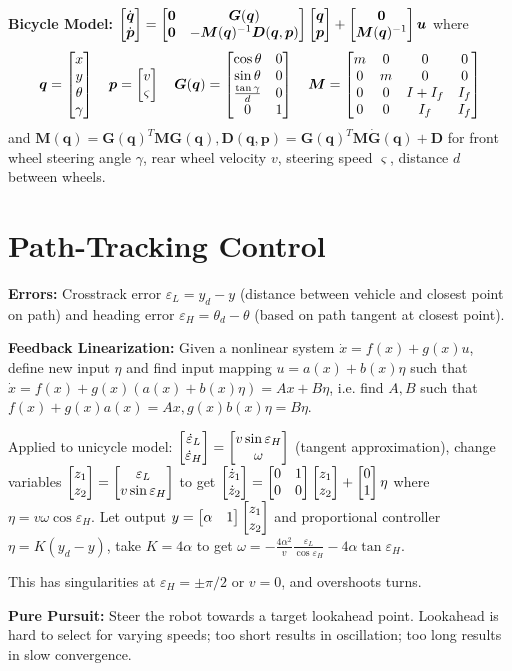 \documentclass[twocolumn, 8pt]{extarticle}
\begin{document}
\textbf{Bicycle Model:} \(\cvec{\dot{\bm q}}{\dot{\bm p}} = \mattwo{\bm 0}{\bm G(\bm q)}{\bm 0}{-\bm M(\bm q)^{-1}\bm D(\bm q, \bm p)}\cvec{\bm q}{\bm p} + \cvec{\bm 0}{\bm M(\bm q)^{-1}}\bm u\)
where
\[\bm q = \cvec{x}{y}{\theta}{\gamma} \quad \bm p = \cvec{v}{\varsigma} \quad \bm G(\bm q) = \mat{\mrow{\cos\theta}{0}\mrow{\sin\theta}{0}\mrow{\frac{\tan\gamma}{d}}{0}\mrow{0}{1}} \quad
\bm M = \matfour{m}{0}{0}{0}{0}{m}{0}{0}{0}{0}{I + I_f}{I_f}{0}{0}{I_f}{I_f}\]
and \(\bm M(\bm q) = \bm G(\bm q)^T\bm M\bm G(\bm q), \bm D(\bm q, \bm p) = \bm G(\bm q)^T\bm M\dot{\bm G}(\bm q) + \bm D\)
for front wheel steering angle \(\gamma\), rear wheel velocity \(v\), steering speed \(\varsigma\), distance \(d\)
between wheels.

\section{Path-Tracking Control} %

\textbf{Errors:} Crosstrack error \(\varepsilon _L = y_d - y\) (distance between vehicle and closest point on path) and
heading error \(\varepsilon _H = \theta _d - \theta\) (based on path tangent at closest point).

\textbf{Feedback Linearization:} Given a nonlinear system \(\dot x = f(x) + g(x)u\), define new input \(\eta\) and find
input mapping \(u = a(x) + b(x)\eta\) such that \(\dot x = f(x) + g(x)(a(x) + b(x)\eta) = Ax + B\eta\), i.e. find \(A, B\)
such that \(f(x) + g(x)a(x) = Ax, g(x)b(x)\eta = B\eta\).

Applied to unicycle model: \(\cvec{\dot\varepsilon _L}{\dot\varepsilon _H} = \cvec{v\sin\varepsilon _H}{\omega}\)
(tangent approximation), change variables \(\cvec{z_1}{z_2} = \cvec{\varepsilon _L}{v\sin\varepsilon _H}\) to get
\(\cvec{\dot z_1}{\dot z_2} = \mattwo{0}{1}{0}{0}\cvec{z_1}{z_2} + \cvec{0}{1}\eta\) where \(\eta = v\omega\cos\varepsilon _H\).
Let output \(y = \rvec{\alpha}{1}\cvec{z_1}{z_2}\) and proportional controller \(\eta = K(y_d - y)\), take \(K = 4\alpha\)
to get \(\displaystyle \omega = -\frac{4\alpha^2}{v}\frac{\varepsilon _L}{\cos\varepsilon _H} - 4\alpha\tan\varepsilon _H\).

This has singularities at \(\varepsilon _H = \pm\pi / 2\) or \(v = 0\), and overshoots turns.

\textbf{Pure Pursuit:} Steer the robot towards a target lookahead point. Lookahead is hard to select for varying speeds;
too short results in oscillation; too long results in slow convergence.
\end{document}
